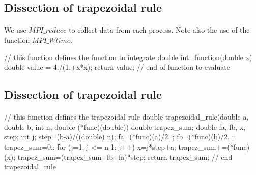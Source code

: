 \documentclass[%
oneside,                 %
final,                   %
10pt]{article}
\begin{document}
\ecppcod



\subsection{Dissection of trapezoidal rule}

\paragraph{}

We use $MPI\_reduce$ to collect data from each process. Note also the use of the function 
$MPI\_Wtime$. 








\bcppcod
//  this function defines the function to integrate
double int_function(double x)
{
  double value = 4./(1.+x*x);
  return value;
} // end of function to evaluate


\ecppcod



\subsection{Dissection of trapezoidal rule}

\paragraph{}



















\bcppcod
//  this function defines the trapezoidal rule
double trapezoidal_rule(double a, double b, int n, 
                         double (*func)(double))
{
  double trapez_sum;
  double fa, fb, x, step;
  int    j;
  step=(b-a)/((double) n);
  fa=(*func)(a)/2. ;
  fb=(*func)(b)/2. ;
  trapez_sum=0.;
  for (j=1; j <= n-1; j++){
    x=j*step+a;
    trapez_sum+=(*func)(x);
  }
  trapez_sum=(trapez_sum+fb+fa)*step;
  return trapez_sum;
}  // end trapezoidal_rule 
\end{document}

